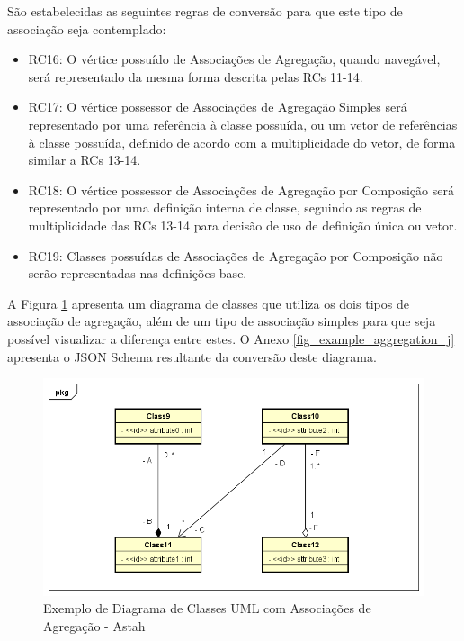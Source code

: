 São estabelecidas as seguintes regras de conversão para que este tipo de associação seja contemplado:

\begin{itemize}
    \item RC16: O vértice possuído de Associações de Agregação, quando navegável, será representado da mesma forma descrita pelas RCs 11-14.
    
    \item RC17: O vértice possessor de Associações de Agregação Simples será representado por uma referência à classe possuída, ou um vetor de referências à classe possuída, definido de acordo com a multiplicidade do vetor, de forma similar a RCs 13-14.
    
    \item RC18: O vértice possessor de Associações de Agregação por Composição será representado por uma definição interna de classe, seguindo as regras de multiplicidade das RCs 13-14 para decisão de uso de definição única ou vetor.
    
    \item RC19: Classes possuídas de Associações de Agregação por Composição não serão representadas nas definições base.
\end{itemize}

A Figura \ref{fig_example_aggregation} apresenta um diagrama de classes que utiliza os dois tipos de associação de agregação, além de um tipo de associação simples para que seja possível visualizar a diferença entre estes. O Anexo \ref{fig_example_aggregation_j} apresenta o JSON Schema resultante da conversão deste diagrama.

\begin{figure}
    \begin{center}
        \includegraphics[scale=0.7]{imagens/Example_Aggregation.png}
    \end{center}
	\caption{\label{fig_example_aggregation}Exemplo de Diagrama de Classes UML com Associações de Agregação - Astah}
\end{figure}

